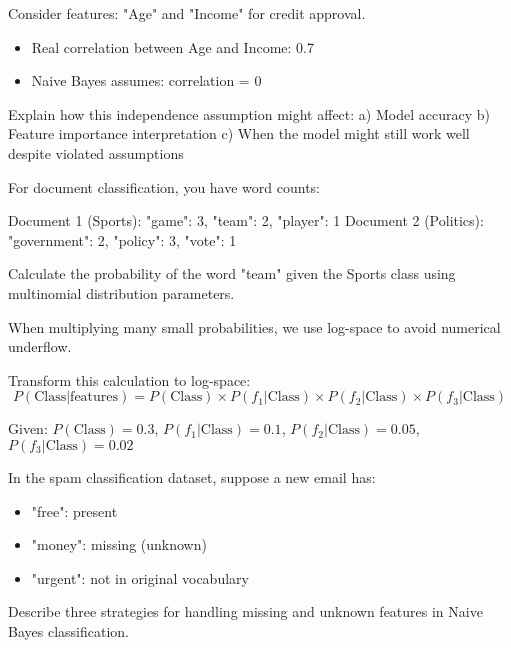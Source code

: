 \documentclass{article}
\newcounter{exercise}
\begin{document}
\begin{tcolorbox}[colback=gray!5!white,colframe=gray!75!black,title=Problem \stepcounter{exercise}: Independence Assumption Analysis]

Consider features: "Age" and "Income" for credit approval.
\begin{itemize}
    \item Real correlation between Age and Income: 0.7
    \item Naive Bayes assumes: correlation = 0
\end{itemize}

Explain how this independence assumption might affect:
a) Model accuracy
b) Feature importance interpretation
c) When the model might still work well despite violated assumptions
\end{tcolorbox}

\begin{tcolorbox}[colback=gray!5!white,colframe=gray!75!black,title=Problem \stepcounter{exercise}: Multinomial Naive Bayes]

For document classification, you have word counts:

Document 1 (Sports): "game": 3, "team": 2, "player": 1
Document 2 (Politics): "government": 2, "policy": 3, "vote": 1

Calculate the probability of the word "team" given the Sports class using multinomial distribution parameters.
\end{tcolorbox}

\begin{tcolorbox}[colback=gray!5!white,colframe=gray!75!black,title=Problem \stepcounter{exercise}: Log-Space Computation]

When multiplying many small probabilities, we use log-space to avoid numerical underflow.

Transform this calculation to log-space:
$$P(\text{Class}|\text{features}) = P(\text{Class}) \times P(f_1|\text{Class}) \times P(f_2|\text{Class}) \times P(f_3|\text{Class})$$

Given: $P(\text{Class}) = 0.3$, $P(f_1|\text{Class}) = 0.1$, $P(f_2|\text{Class}) = 0.05$, $P(f_3|\text{Class}) = 0.02$
\end{tcolorbox}

\begin{tcolorbox}[colback=gray!5!white,colframe=gray!75!black,title=Problem \stepcounter{exercise}: Handling Missing Features]

In the spam classification dataset, suppose a new email has:
\begin{itemize}
    \item "free": present
    \item "money": missing (unknown)
    \item "urgent": not in original vocabulary
\end{itemize}

Describe three strategies for handling missing and unknown features in Naive Bayes classification.
\end{tcolorbox}
\end{document}
